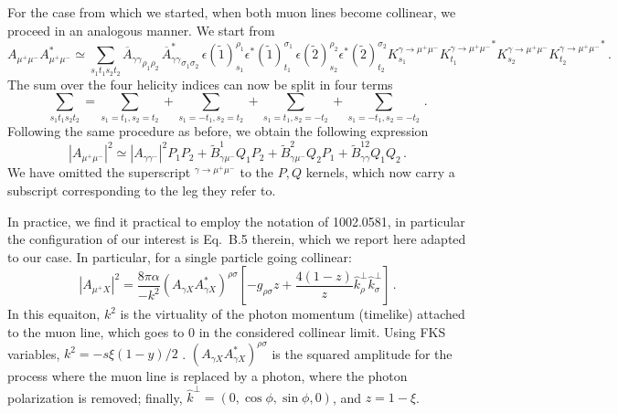 \documentclass[a4paper,10pt]{article}
\begin{document}
For the case from which we started, when both muon lines become collinear, we proceed in an analogous manner. We start from
\begin{equation}
    A_{\mu^+ \mu^-} A_{\mu^+ \mu^-}^* \simeq 
    \sum_{s_1 t_1 s_2 t_2} {\overline A_{\gamma\gamma} }_{\rho_1 \rho_2}\,  {\overline A^*_{\gamma\gamma} }_{\sigma_1\sigma_2} 
    \, \epsilon(\tilde 1)^{\rho_1}_{s_1}  \epsilon^*(\tilde 1)^{\sigma_1}_{t_1}
    \, \epsilon(\tilde 2)^{\rho_2}_{s_2}  \epsilon^*(\tilde 2)^{\sigma_2}_{t_2}
    K^{\gamma\to\mu^+\mu^-}_{s_1} {K^{\gamma\to\mu^+\mu^-}_{t_1}}^*
    K^{\gamma\to\mu^+\mu^-}_{s_2} {K^{\gamma\to\mu^+\mu^-}_{t_2}}^*\,.
\end{equation}
The sum over the four helicity indices can now be split in four terms
\begin{equation}
 \sum_{s_1 t_1 s_2 t_2} =  \sum_{s_1= t_1, s_2=t_2} + \sum_{s_1=-t_1, s_2=t_2} +\sum_{s_1= t_1, s_2=-t_2} + \sum_{s_1=-t_1, s_2=-t_2}\,.
\end{equation}
Following the same procedure as before, we obtain the following expression
\begin{equation}
  |A_{\mu^+ \mu^-} |^2 \simeq  |A_{\gamma \gamma^-} |^2 P_1 P_2  +  
                          \tilde B^1_{\gamma \mu^-}  Q_1 P_2 +
                          \tilde B^2_{\gamma \mu^-}  Q_2 P_1 +
                          \tilde B^{12}_{\gamma \gamma}  Q_1 Q_2\, .
                          \label{eq:doublecoll}
\end{equation}
We have omitted the superscript ${ }^{\gamma\to\mu^+\mu^-}$ to the $P,Q$ kernels, which now carry a subscript corresponding to the leg they refer to.

In practice, we find it practical to employ the notation of 1002.0581, in particular the configuration of our interest is Eq.~B.5 therein, which we report
here adapted to our case. In particular, for a single particle going collinear:
\begin{equation}
    |  A_{\mu^+ X} |^2= \frac{8\pi\alpha}{-k^2}\left(A_{\gamma X}A_{\gamma X}^* \right)^{\rho\sigma}\left[- g_{\rho\sigma} z + \frac{4(1-z)}{z} \hat k^\perp_\rho \hat k^\perp_\sigma\right]\,.
    \label{eq:collpwg}
\end{equation}
In this equaiton, $k^2$ is the virtuality of the photon momentum (timelike) attached to the muon line, which goes to 0 in the considered collinear limit. Using
FKS variables,  $k^2=-s \xi (1-y)/2$ .
$\left(A_{\gamma X}A_{\gamma X}^* \right)^{\rho\sigma}$ is the squared amplitude for the process where the muon line is replaced by a photon, where the photon polarization is removed; finally, $\hat k^\perp = \left(0,\cos \phi, \sin \phi,0\right)$, and $z=1-\xi$. 
\end{document}
